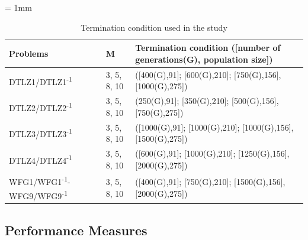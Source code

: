 \documentclass{sig-alternate}
\begin{document}
\begin{table}[!htb]
\begin{threeparttable}
\caption{Termination condition used in the study}
\label{tab:params_term_con}
\tabcolsep = 1mm
\begin{tabulary}{0.48\textwidth}{LLL}
\hline
\textbf{Problems}&\textbf{M}& \textbf{Termination condition ([number of generations(G), population size])}\\
\hline
DTLZ1/DTLZ1\textsuperscript{-1}& 3, 5, 8, 10 &([400(G),91]; [600(G),210]; [750(G),156], [1000(G),275])\\
DTLZ2/DTLZ2\textsuperscript{-1}& 3, 5, 8, 10 &(250(G),91]; [350(G),210]; [500(G),156], [750(G),275])\\
DTLZ3/DTLZ3\textsuperscript{-1}& 3, 5, 8, 10 &([1000(G),91]; [1000(G),210]; [1000(G),156],[1500(G),275])\\
DTLZ4/DTLZ4\textsuperscript{-1}& 3, 5, 8, 10 &([600(G),91]; [1000(G),210]; [1250(G),156], [2000(G),275])\\
WFG1/WFG1\textsuperscript{-1}-WFG9/WFG9\textsuperscript{-1}& 3, 5, 8, 10 &([400(G),91]; [750(G),210]; [1500(G),156], [2000(G),275])\\
\hline
\end{tabulary}
\end{threeparttable}
\end{table}

\subsection{Performance Measures}
\label{sec:perf}
\end{document}
